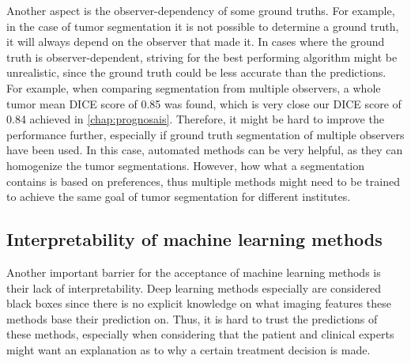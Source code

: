 Another aspect is the observer-dependency of some ground truths.
For example, in the case of tumor segmentation it is not possible to determine a  ground truth, it will always depend on the observer that made it.
In cases where the ground truth is observer-dependent, striving for the best performing algorithm might be unrealistic, since the ground truth could be less accurate than the predictions.
For example, when comparing segmentation from multiple observers, a whole \gls{tumor} mean DICE score of 0.85 was found, which is very close our DICE score of 0.84 achieved in \cref{chap:prognosais}.
Therefore, it might be hard to improve the performance further, especially if ground truth segmentation of multiple observers have been used.
In this case, automated methods can be very helpful, as they can homogenize the \gls{tumor} segmentations.
However, how what a segmentation contains is based on preferences, thus multiple methods might need to be trained to achieve the same goal of \gls{tumor} segmentation for different institutes.


\subsection{Interpretability of machine learning methods}

Another important barrier for the acceptance of machine learning methods is their lack of interpretability.
Deep learning methods especially are considered black boxes since there is no explicit knowledge on what imaging features these methods base their prediction on.
Thus, it is hard to trust the predictions of these methods, especially when considering that the patient and clinical experts might want an explanation as to why a certain treatment decision is made.

